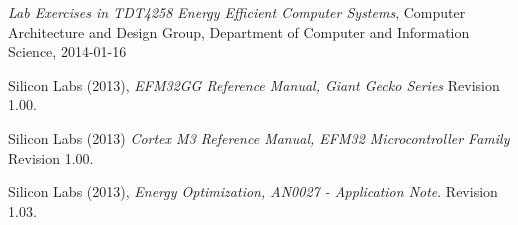
\begin{thebibliography}{9}

  \emph{Lab Exercises in TDT4258 Energy Efficient Computer Systems},
  Computer Architecture and Design Group,
  Department of Computer and Information Science,
  2014-01-16

	Silicon Labs (2013),
	\emph{EFM32GG Reference Manual, Giant Gecko Series}
	Revision 1.00.
	
	Silicon Labs (2013)
	\emph{Cortex M3 Reference Manual, EFM32 Microcontroller Family}
	Revision 1.00.

	Silicon Labs (2013),
	\emph{Energy Optimization, AN0027 - Application Note}.
	Revision 1.03.

\end{thebibliography}
